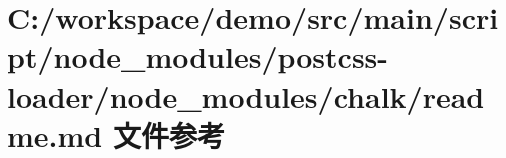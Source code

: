 \hypertarget{node__modules_2postcss-loader_2node__modules_2chalk_2_r_e_a_d_m_e_8md}{}\section{C\+:/workspace/demo/src/main/script/node\+\_\+modules/postcss-\/loader/node\+\_\+modules/chalk/readme.md 文件参考}
\label{node__modules_2postcss-loader_2node__modules_2chalk_2_r_e_a_d_m_e_8md}
